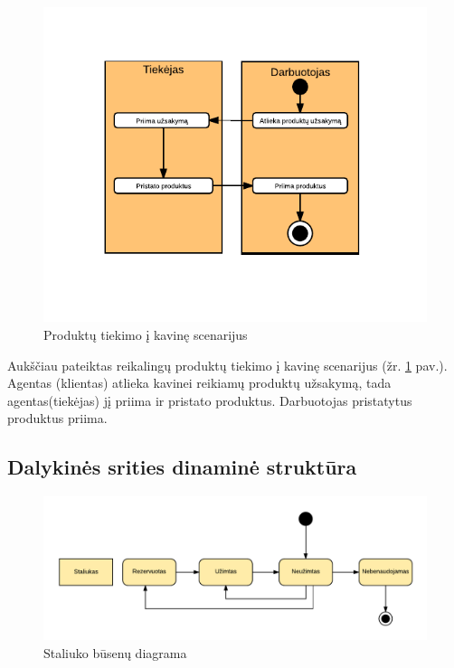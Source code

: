 \documentclass{VUMIFPSkursinis}
\begin{document}
	\begin {figure}[H]
	\centering
		
		\includegraphics[scale=1]{img/3lab/Diagrama6}
		\caption{Produktų tiekimo į kavinę scenarijus}
		\label{fig:diagrama6}
	\end{figure}
Aukščiau pateiktas reikalingų produktų tiekimo į kavinę scenarijus (žr. \ref{fig:diagrama6} pav.). Agentas (klientas) atlieka kavinei reikiamų produktų užsakymą, tada 
agentas(tiekėjas) jį priima ir pristato produktus. Darbuotojas pristatytus produktus priima. 
\pagebreak
\subsection{Dalykinės srities dinaminė struktūra}

	\begin {figure}[H]
	\centering
		
		\includegraphics[scale=0.9]{img/3lab/Diagrama7}
		\caption{Staliuko būsenų diagrama}
		\label{fig:diagrama7}
	\end{figure}
		
\end{document}
